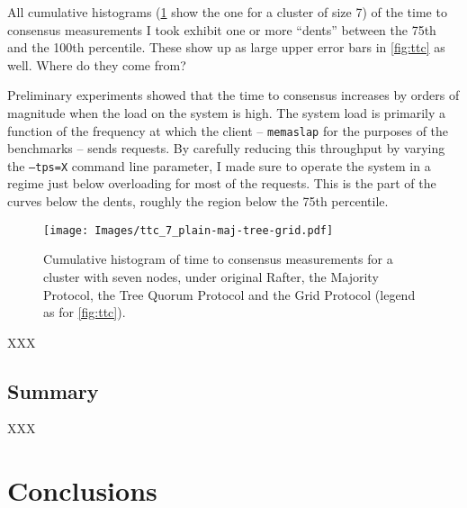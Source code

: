\documentclass[11pt,chapterprefix=true,toc=bibliography,numbers=noendperiod,
               footnotes=multiple,twoside]{scrreprt}
\begin{document}

All cumulative histograms (\cref{fig:plain-maj-tree-grid-ttc} show the one for a cluster of size 7) of the time to consensus measurements I took exhibit one or more \enquote{dents} between the 75th and the 100th percentile. These show up as large upper error bars in \cref{fig:ttc} as well. Where do they come from?

Preliminary experiments showed that the time to consensus increases by orders of magnitude when the load on the system is high. The system load is primarily a function of the frequency at which the client -- \texttt{memaslap} for the purposes of the benchmarks -- sends requests. By carefully reducing this throughput by varying the \texttt{--tps=X} command line parameter, I made sure to operate the system in a regime just below overloading for most of the requests. This is the part of the curves below the dents, roughly the region below the 75th percentile.

\begin{figure}[h]
    \centering
    \texttt{[image: Images/ttc\_7\_plain-maj-tree-grid.pdf]}
    \caption{Cumulative histogram of time to consensus measurements for a cluster with seven nodes, under original Rafter, the Majority Protocol, the Tree Quorum Protocol and the Grid Protocol (legend as for \cref{fig:ttc}).}
    \label{fig:plain-maj-tree-grid-ttc}
\end{figure}

XXX

\section{Summary}

XXX



\chapter{Conclusions\label{ch:conclusions}}



\printbibliography

\end{document}
